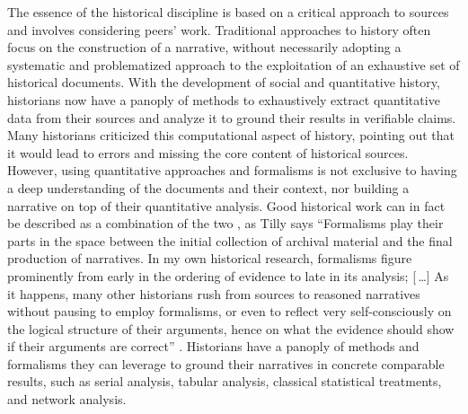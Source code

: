 

The essence of the historical discipline is based on a critical approach to sources and involves considering peers' work.
Traditional approaches to history often focus on the construction of a narrative, without necessarily adopting a systematic and problematized approach to the exploitation of an exhaustive set of historical documents\cite{tillyObservationsSocialProcesses2004}.
With the development of social and quantitative history, historians now have a panoply of methods to exhaustively extract quantitative data from their sources and analyze it to ground their results in verifiable claims.
Many historians criticized this computational aspect of history\cite{lepetitHistoireQuantitativeDeux1989, fogelLimitsQuantitativeMethods1975, barnesBigDataLittle2013}, pointing out that it would lead to errors and missing the core content of historical sources.
However, using quantitative approaches and formalisms is not exclusive to having a deep understanding of the documents and their context, nor building a narrative on top of their quantitative analysis.
Good historical work can in fact be described as a combination of the two \cite{karila-cohenNouvellesCuisinesHistoire2018}, as Tilly says ``Formalisms play their parts in the space between the initial collection of archival material and the final production of narratives. In my own historical research, formalisms figure prominently from early in the ordering of evidence to late in its analysis; \textup{[\,\dots]} As it happens, many other historians rush from sources to reasoned narratives without pausing to employ formalisms, or even to reflect very self-consciously on the logical structure of their arguments, hence on what the evidence should show if their arguments are correct'' \cite{tillyObservationsSocialProcesses2004}.
Historians have a panoply of methods and formalisms they can leverage to ground their narratives in concrete comparable results, such as serial analysis, tabular analysis, classical statistical treatments, and network analysis.


